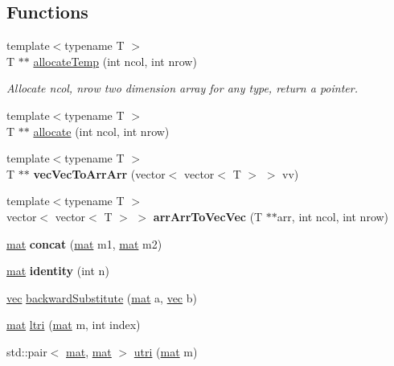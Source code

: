 \subsection*{Functions}
\begin{DoxyCompactItemize}
\item 
{\footnotesize template$<$typename T $>$ }\\T $\ast$$\ast$ \mbox{\hyperlink{namespace_matrix_vector_af94d7bf32de597487458905d7f703d65}{allocate\+Temp}} (int ncol, int nrow)
\begin{DoxyCompactList}\small\item\em Allocate ncol, nrow two dimension array for any type, return a pointer. \end{DoxyCompactList}\item 
{\footnotesize template$<$typename T $>$ }\\T $\ast$$\ast$ \mbox{\hyperlink{namespace_matrix_vector_a26820b913b9a7cc4ef30f3bf085a1560}{allocate}} (int ncol, int nrow)
\item 
\mbox{\label{namespace_matrix_vector_a10a4917fdbb03e420addd120af1cf94d}} 
{\footnotesize template$<$typename T $>$ }\\T $\ast$$\ast$ {\bfseries vec\+Vec\+To\+Arr\+Arr} (vector$<$ vector$<$ T $>$ $>$ vv)
\item 
\mbox{\label{namespace_matrix_vector_a16a4b513f4fa45632bb6a2368b8cbc4a}} 
{\footnotesize template$<$typename T $>$ }\\vector$<$ vector$<$ T $>$ $>$ {\bfseries arr\+Arr\+To\+Vec\+Vec} (T $\ast$$\ast$arr, int ncol, int nrow)
\item 
\mbox{\label{namespace_matrix_vector_ace5f4beedee016c9d35225d8e3785bd3}} 
\mbox{\hyperlink{class_matrix_vector_1_1mat}{mat}} {\bfseries concat} (\mbox{\hyperlink{class_matrix_vector_1_1mat}{mat}} m1, \mbox{\hyperlink{class_matrix_vector_1_1mat}{mat}} m2)
\item 
\mbox{\label{namespace_matrix_vector_af8b4ba38ebf013918af987da1b583b78}} 
\mbox{\hyperlink{class_matrix_vector_1_1mat}{mat}} {\bfseries identity} (int n)
\item 
\mbox{\hyperlink{class_matrix_vector_1_1vec}{vec}} \mbox{\hyperlink{namespace_matrix_vector_a41c576d98e33eb3f60bc286ede16df87}{backward\+Substitute}} (\mbox{\hyperlink{class_matrix_vector_1_1mat}{mat}} a, \mbox{\hyperlink{class_matrix_vector_1_1vec}{vec}} b)
\item 
\mbox{\hyperlink{class_matrix_vector_1_1mat}{mat}} \mbox{\hyperlink{namespace_matrix_vector_af11ba87c88a70108422ac52c75f4e60f}{ltri}} (\mbox{\hyperlink{class_matrix_vector_1_1mat}{mat}} m, int index)
\item 
std\+::pair$<$ \mbox{\hyperlink{class_matrix_vector_1_1mat}{mat}}, \mbox{\hyperlink{class_matrix_vector_1_1mat}{mat}} $>$ \mbox{\hyperlink{namespace_matrix_vector_a21f46727b11ebce5213b7338153274c2}{utri}} (\mbox{\hyperlink{class_matrix_vector_1_1mat}{mat}} m)
\end{DoxyCompactItemize}



